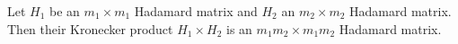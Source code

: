 Let $H_1$ be an $m_1 \times m_1$ Hadamard matrix and $H_2$ an $m_2 \times m_2$ Hadamard matrix. Then their Kronecker product $H_1 \times H_2$ is an $m_1 m_2 \times m_1 m_2$ Hadamard matrix.
